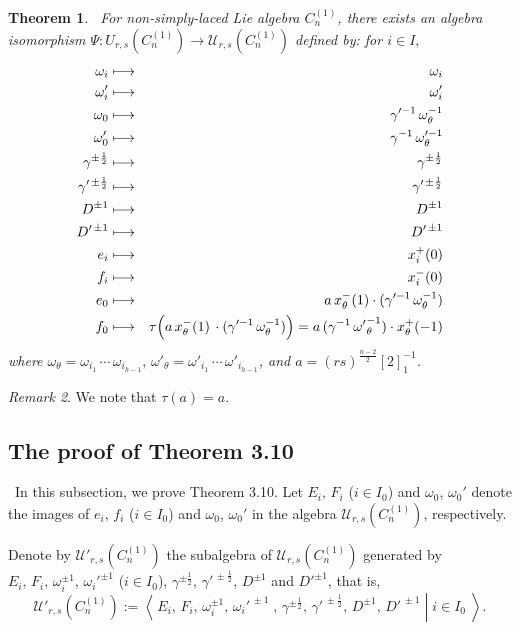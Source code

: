 \documentclass{amsproc}
\newtheorem{theo}{Theorem}[section]
\theoremstyle{remark}
\newtheorem{remark}[theo]{Remark}
\numberwithin{equation}{section}
\begin{document}
\begin{theo} \ For non-simply-laced Lie algebra $C_n^{(1)}$,
 there exists an algebra isomorphism
$\Psi: U_{r,s}(C_n^{(1)}) \longrightarrow {\mathcal
U}_{r,s}(C_n^{(1)})$ defined by: for $i\in I,$
\begin{eqnarray*}
\omega_i&\longmapsto& {\omega}_i\\
\omega'_i&\longmapsto& {\omega}'_i \\
\omega_0&\longmapsto& \gamma'^{-1}\, {\omega}_{\theta}^{-1}\\
\omega'_0&\longmapsto& \gamma^{-1}\, {\omega}_{\theta}'^{-1}\\
\gamma^{\pm\frac{1}2}&\longmapsto& \gamma^{\pm\frac{1}2}\\
\gamma'^{\,\pm\frac{1}2}&\longmapsto& \gamma'^{\,\pm\frac{1}2}\\
D^{\pm1}&\longmapsto& D^{\pm1}\\
D'^{\,\pm1}&\longmapsto& D'^{\,\pm1}\\
e_i&\longmapsto& x_i^+(0)\\
f_i&\longmapsto& x_i^-(0)\\
e_0&\longmapsto& a\,
x^-_{\theta}(1)\cdot(\gamma'^{-1}\,{\omega}_{\theta}^{-1})\\
f_0 &\longmapsto& \tau\Bigl(a\,x^-_{\theta}(1)
      \,\cdot(\gamma'^{-1}\,{\omega}_{\theta}^{-1})\Bigr)
      =a\,(\gamma^{-1}\,{{\omega}'}_{\theta}^{-1})\cdot
      x_{\theta}^+(-1)
\end{eqnarray*}
where ${\omega}_{\theta}={\omega}_{i_1}\,\cdots\,
{\omega}_{i_{h-1}},\,{\omega}'_{\theta}={\omega}'_{i_1}\,\cdots\, {\omega}'_{i_{h-1}}$,
and $a=(rs)^{\frac{n-2}{2}}[2]_1^{-1}$.
\end{theo}
\begin{remark}  We note that $\tau(a)=a$.
\end{remark}

\subsection{The proof of Theorem 3.10} \  In this subsection, we
prove Theorem 3.10. Let $E_i,\,F_i$ ($i\in I_0$) and ${\omega}_0$,
${\omega}_0'$ denote the images of $e_i,\,f_i$ ($i\in I_0$) and ${\omega}_0$,
${\omega}_0'$ in the algebra ${\mathcal U}_{r,s}(C_n^{(1)})$,
respectively.

Denote by $\mathcal{U}'_{r,s}(C_n^{(1)})$ the subalgebra of
$\mathcal{U}_{r,s}(C_n^{(1)})$ generated by
$E_i,\,F_i,\,{\omega}_i^{\pm1}$, ${\omega}_i'^{\pm1}$ ($i\in I_0$),
$\gamma^{\pm\frac{1}2},\, \gamma'^{\,\pm\frac{1}2}$, $D^{\pm1}$ and
$D'^{\pm1}$, that is,
$$
{\mathcal U}'_{r,s}(C_n^{(1)}):=\left.\left\langle\, E_i,\, F_i,\,
{\omega}_i^{\pm1},\, {\omega}_i'^{\,\pm1}\;,\, \gamma^{\pm\frac{1}2},\,
\gamma'^{\,\pm\frac{1}2},\, D^{\pm1},\, D'^{\,\pm1}\; \right| \;i\in
I_0\;\right\rangle.
$$
\end{document}
